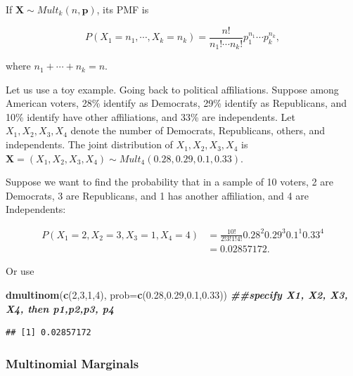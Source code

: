 \documentclass[
]{book}
\newenvironment{Shaded}{\begin{snugshade}}{\end{snugshade}}
\newcommand{\AttributeTok}[1]{\textcolor[rgb]{0.13,0.29,0.53}{#1}}
\newcommand{\DecValTok}[1]{\textcolor[rgb]{0.00,0.00,0.81}{#1}}
\newcommand{\DocumentationTok}[1]{\textcolor[rgb]{0.56,0.35,0.01}{\textbf{\textit{#1}}}}
\newcommand{\FloatTok}[1]{\textcolor[rgb]{0.00,0.00,0.81}{#1}}
\newcommand{\FunctionTok}[1]{\textcolor[rgb]{0.13,0.29,0.53}{\textbf{#1}}}
\newcommand{\NormalTok}[1]{#1}
\begin{document}
If \(\boldsymbol{X} \sim Mult_k(n, \boldsymbol{p})\), its PMF is

\begin{equation} 
P(X_1 = n_1, \cdots, X_k = n_k) = \frac{n!}{n_{1}! \cdots n_{k}!} p_1^{n_1} \cdots p_k^{n_k},
\label{eq:5-multinomial}
\end{equation}

where \(n_1 + \cdots + n_k = n\).

Let us use a toy example. Going back to political affiliations. Suppose among American voters, 28\% identify as Democrats, 29\% identify as Republicans, and 10\% identify have other affiliations, and 33\% are independents. Let \(X_1, X_2, X_3, X_4\) denote the number of Democrats, Republicans, others, and independents. The joint distribution of \(X_1, X_2, X_3, X_4\) is \(\boldsymbol{X} = (X_1, X_2, X_3, X_4) \sim Mult_4(0.28, 0.29, 0.1, 0.33)\).

Suppose we want to find the probability that in a sample of 10 voters, 2 are Democrats, 3 are Republicans, and 1 has another affiliation, and 4 are Independents:

\[
\begin{split}
P(X_1 = 2, X_2 = 3, X_3 = 1, X_4 = 4) &= \frac{10!}{2! 3! 1!4!} 0.28^{2} 0.29^{3} 0.1^1 0.33^4\\
 &= 0.02857172.
\end{split}
\]

Or use

\begin{Shaded}
\begin{Highlighting}[]
\FunctionTok{dmultinom}\NormalTok{(}\FunctionTok{c}\NormalTok{(}\DecValTok{2}\NormalTok{,}\DecValTok{3}\NormalTok{,}\DecValTok{1}\NormalTok{,}\DecValTok{4}\NormalTok{), }\AttributeTok{prob=}\FunctionTok{c}\NormalTok{(}\FloatTok{0.28}\NormalTok{,}\FloatTok{0.29}\NormalTok{,}\FloatTok{0.1}\NormalTok{,}\FloatTok{0.33}\NormalTok{)) }\DocumentationTok{\#\#specify X1, X2, X3, X4, then p1,p2,p3, p4}
\end{Highlighting}
\end{Shaded}

\begin{verbatim}
## [1] 0.02857172
\end{verbatim}

\subsubsection{Multinomial Marginals}\label{multinomial-marginals}
\end{document}
